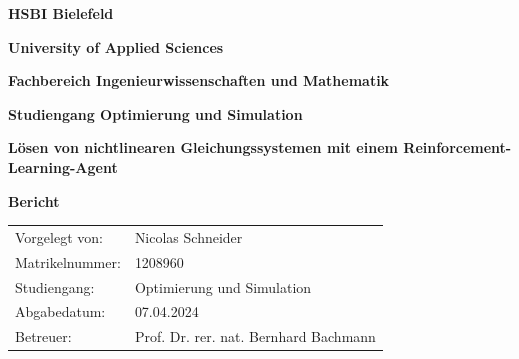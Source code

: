 \documentclass{article}
\theoremstyle{newline}
\begin{document}

\pagestyle{fancy}
\lhead{\small{\slshape}}
\chead{}	
\rhead{\mdseries \leftmark}


\begin{titlepage}



\centering

{\bfseries HSBI Bielefeld \par}
\vspace{0.25cm}
{\bfseries University of Applied Sciences \par}
\vspace{0.25cm}
{\bfseries Fachbereich Ingenieurwissenschaften und Mathematik \par}
\vspace{0.25cm}
{\bfseries Studiengang Optimierung und Simulation \par}
\vspace{1.5cm}
{\huge\bfseries Lösen von nichtlinearen Gleichungssystemen mit einem Reinforcement-Learning-Agent \par}
\vspace{2.5cm}
{\Large\bfseries Bericht \par}
{\vspace{8.5cm}}

\flushleft
\begin{tabular}{ll}
	Vorgelegt von: & Nicolas Schneider \vspace{0.25cm}\\
	Matrikelnummer: & 1208960 \vspace{0.25cm} \\
	Studiengang: & Optimierung und Simulation \vspace{0.5cm} \\
	Abgabedatum: & 07.04.2024 \vspace{0.5cm} \\
	Betreuer: & Prof. Dr. rer. nat. Bernhard Bachmann
\end{tabular}
\vfill
\end{titlepage}


\thispagestyle{empty}
\newpage
\end{document}
